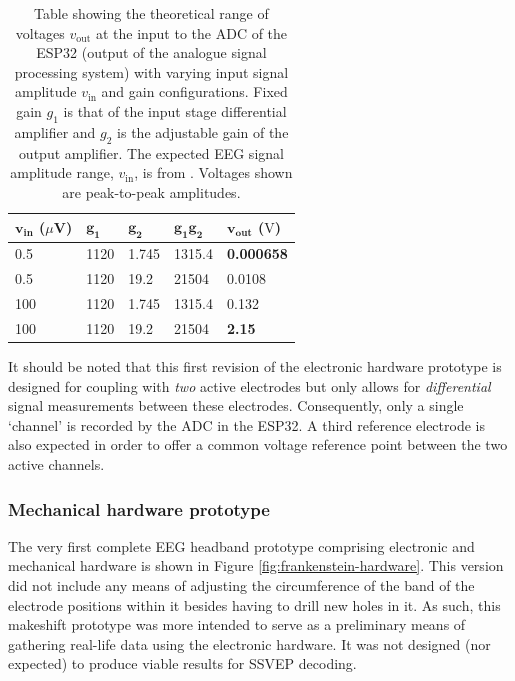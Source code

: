 \begin{table}[]
\centering
\begin{tabular}{@{}lllll@{}}
\toprule
\textbf{$\mathbf{v_{\textrm{in}}}$} ($\mu$V) & \textbf{$\mathbf{g_1}$} & \textbf{$\mathbf{g_2}$} & \textbf{$\mathbf{g_1g_2}$} & \textbf{$\mathbf{v_{\textrm{out}}}$} ($\textrm{V}$)\\ \midrule
0.5          & 1120        & 1.745       & 1315.4          & \textbf{0.000658}        \\
0.5          & 1120        & 19.2        & 21504           & 0.0108          \\
100          & 1120        & 1.745       & 1315.4          & 0.132           \\
100          & 1120        & 19.2        & 21504           & \textbf{2.15}            \\ \bottomrule
\end{tabular}
\caption[Table showing the theoretical range of voltages measured at the ADC of the ESP32 for varying input signal magnitudes and gain configurations]{Table showing the theoretical range of voltages $v_{\textrm{out}}$ at the input to the ADC of the ESP32 (output of the analogue signal processing system) with varying input signal amplitude $v_{\textrm{in}}$ and gain configurations. Fixed gain $g_1$ is that of the input stage differential amplifier and $g_2$ is the adjustable gain of the output amplifier. The expected EEG signal amplitude range, $v_{\textrm{in}}$, is from \cite{teplan-eeg-measurement}. Voltages shown are peak-to-peak amplitudes.}
\label{tab:gain-voltage-ranges}
\end{table}

It should be noted that this first revision of the electronic hardware prototype is designed for coupling with \textit{two} active electrodes but only allows for \textit{differential} signal measurements between these electrodes. Consequently, only a single `channel' is recorded by the ADC in the ESP32. A third reference electrode is also expected in order to offer a common voltage reference point between the two active channels. 

\subsubsection{Mechanical hardware prototype}

The very first complete EEG headband prototype comprising electronic and mechanical hardware is shown in Figure \ref{fig:frankenstein-hardware}. This version did not include any means of adjusting the circumference of the band of the electrode positions within it besides having to drill new holes in it. As such, this makeshift prototype was more intended to serve as a preliminary means of gathering real-life data using the electronic hardware. It was not designed (nor expected) to produce viable results for SSVEP decoding. 

